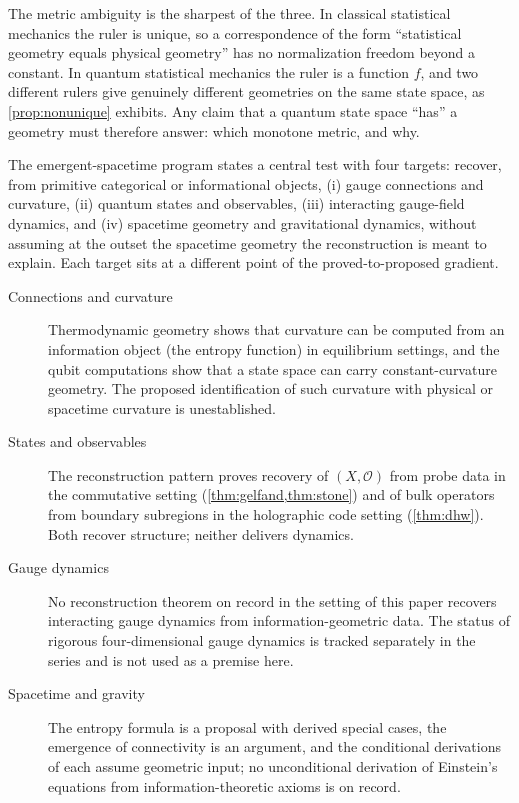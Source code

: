 \documentclass[11pt,letterpaper]{article}
\theoremstyle{definition}
\theoremstyle{remark}
\begin{document}
The metric ambiguity is the sharpest of the three. In classical statistical mechanics the ruler is unique, so a correspondence of the form ``statistical geometry equals physical geometry'' has no normalization freedom beyond a constant. In quantum statistical mechanics the ruler is a function $f$, and two different rulers give genuinely different geometries on the same state space, as \cref{prop:nonunique} exhibits. Any claim that a quantum state space ``has'' a geometry must therefore answer: which monotone metric, and why.

The emergent-spacetime program states a central test with four targets: recover, from primitive categorical or informational objects, (i) gauge connections and curvature, (ii) quantum states and observables, (iii) interacting gauge-field dynamics, and (iv) spacetime geometry and gravitational dynamics, without assuming at the outset the spacetime geometry the reconstruction is meant to explain. Each target sits at a different point of the proved-to-proposed gradient.

\begin{description}
\item[Connections and curvature] Thermodynamic geometry shows that curvature can be computed from an information object (the entropy function) in equilibrium settings, and the qubit computations show that a state space can carry constant-curvature geometry. The proposed identification of such curvature with physical or spacetime curvature is unestablished.
\item[States and observables] The reconstruction pattern proves recovery of $(X, \mathcal{O})$ from probe data in the commutative setting (\cref{thm:gelfand,thm:stone}) and of bulk operators from boundary subregions in the holographic code setting (\cref{thm:dhw}). Both recover structure; neither delivers dynamics.
\item[Gauge dynamics] No reconstruction theorem on record in the setting of this paper recovers interacting gauge dynamics from information-geometric data. The status of rigorous four-dimensional gauge dynamics is tracked separately in the series and is not used as a premise here.
\item[Spacetime and gravity] The entropy formula is a proposal with derived special cases, the emergence of connectivity is an argument, and the conditional derivations of \cite{jacobson, fgkmv, lmvr, jac2016} each assume geometric input; no unconditional derivation of Einstein's equations from information-theoretic axioms is on record.
\end{description}
\end{document}
